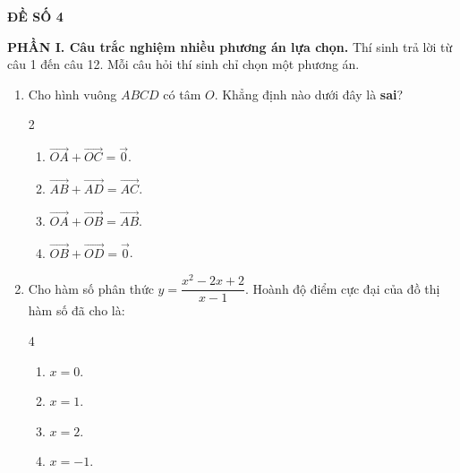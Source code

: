 \documentclass[12pt]{article}
\begin{document}
	\newpage
	\begin{center}
		{\LARGE \textbf{ĐỀ SỐ 4}}\\[4pt]
	\end{center}
	\vspace{4mm}
	
	\noindent\textbf{PHẦN I. Câu trắc nghiệm nhiều phương án lựa chọn.} Thí sinh trả lời từ câu 1 đến câu 12. Mỗi câu hỏi thí sinh chỉ chọn một phương án.
	\vspace{2mm}
	
	\begin{enumerate}[label=\textbf{Câu \arabic*.}, leftmargin=*]
		\item Cho hình vuông $ABCD$ có tâm $O$. Khẳng định nào dưới đây là \textbf{sai}?
		\begin{multicols}{2}
			\begin{enumerate}[label=\Alph*.]
				\item $\overrightarrow{OA} + \overrightarrow{OC} = \vec{0}$.
				\item $\overrightarrow{AB} + \overrightarrow{AD} = \overrightarrow{AC}$.
				\item $\overrightarrow{OA} + \overrightarrow{OB} = \overrightarrow{AB}$.
				\item $\overrightarrow{OB} + \overrightarrow{OD} = \vec{0}$.
			\end{enumerate}
		\end{multicols}
		
		\item Cho hàm số phân thức $y = \dfrac{x^2 - 2x + 2}{x - 1}$. Hoành độ điểm cực đại của đồ thị hàm số đã cho là:
		\begin{multicols}{4}
			\begin{enumerate}[label=\Alph*.]
				\item $x = 0$.
				\item $x = 1$.
				\item $x = 2$.
				\item $x = -1$.
			\end{enumerate}
		\end{multicols}
		

\end{enumerate}
\end{document}
